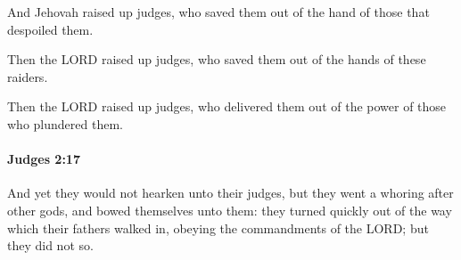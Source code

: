 			\begin{versebox}
					\item[BHS] 
					\item[ASV] And Jehovah raised up judges, who saved them out of the hand of those that despoiled them.
					\item[NIV] Then the LORD raised up judges, who saved them out of the hands of these raiders.
					\item[NRSV] Then the LORD raised up judges, who delivered them out of the power of those who plundered them.
			\end{versebox}

		\paragraph{Judges 2:17} %
			\label{JUDGES-2-17}

			And yet they would not hearken unto their judges, but they went a whoring after other gods, and bowed themselves unto them: they turned quickly out of the way which their fathers walked in, obeying the commandments of the LORD; but they did not so.

